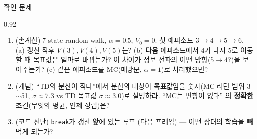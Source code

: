 \begin{frame}{확인 문제}
\begin{center}\begin{varwidth}{0.92\textwidth}
  \small
  \begin{enumerate}
    \item (손계산) 7-state random walk, $\alpha = 0.5$, $V_0 = 0$.
      첫 에피소드 $3\to4\to5\to6$. (a) 갱신 직후 $V(3),V(4),V(5)$는?
      (b) \textbf{다음} 에피소드에서 4가 다시 5로 이동할 때 목표값은
      얼마로 바뀌는가? 이 차이가 정보 전파의 어떤 방향(5$\to$4?)을
      보여주는가? (c) 같은 에피소드를 MC(매방문, $\alpha=1$)로
      처리했으면?
    \item (개념) ``TD의 분산이 작다''에서 분산의 대상이
      \textbf{목표값}임을 숫자(MC 리턴 범위 3$\sim$51, $\sigma\approx7.3$
      vs TD 목표값 $\sigma\approx3.0$)로 설명하라. ``MC는 편향이 없다''
      의 \textbf{정확한} 조건(무엇의 평균, 언제 성립)은?
    \item (코드 진단) \texttt{break}가 갱신 \textbf{앞}에 있는 루프
      (다음 프레임) --- 어떤 상태의 학습을 빼먹게 되는가?
  \end{enumerate}
\end{varwidth}\end{center}
\end{frame}
